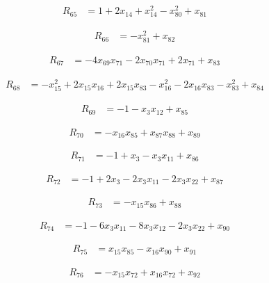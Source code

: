 \begin{align*}
R_{65} &= 1 +2 x_{14} +x_{14}^{2} -x_{80}^{2} +x_{81}
\end{align*}

\begin{align*}
R_{66} &= -x_{81}^{2} +x_{82}
\end{align*}

\begin{align*}
R_{67} &= -4 x_{69} x_{71} -2 x_{70} x_{71} +2 x_{71} +x_{83}
\end{align*}

\begin{align*}
R_{68} &= -x_{15}^{2} +2 x_{15} x_{16} +2 x_{15} x_{83} -x_{16}^{2} -2 x_{16} x_{83} -x_{83}^{2} +x_{84}
\end{align*}

\begin{align*}
R_{69} &= -1 -x_{3} x_{12} +x_{85}
\end{align*}

\begin{align*}
R_{70} &= -x_{16} x_{85} +x_{87} x_{88} +x_{89}
\end{align*}

\begin{align*}
R_{71} &= -1 +x_{3} -x_{3} x_{11} +x_{86}
\end{align*}

\begin{align*}
R_{72} &= -1 +2 x_{3} -2 x_{3} x_{11} -2 x_{3} x_{22} +x_{87}
\end{align*}

\begin{align*}
R_{73} &= -x_{15} x_{86} +x_{88}
\end{align*}

\begin{align*}
R_{74} &= -1 -6 x_{3} x_{11} -8 x_{3} x_{12} -2 x_{3} x_{22} +x_{90}
\end{align*}

\begin{align*}
R_{75} &= x_{15} x_{85} -x_{16} x_{90} +x_{91}
\end{align*}

\begin{align*}
R_{76} &= -x_{15} x_{72} +x_{16} x_{72} +x_{92}
\end{align*}

